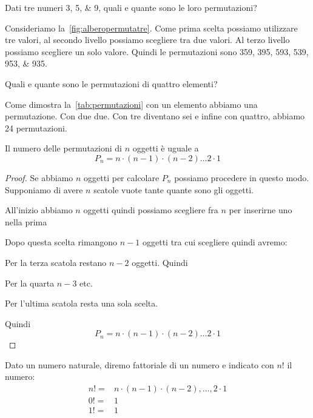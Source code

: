 \begin{exmp}
Dati tre numeri \numlist{3;5;9}, quali e quante sono le loro permutazioni? 
\end{exmp}
Consideriamo la~\vref{fig:alberopermutatre}. Come prima scelta possiamo utilizzare tre valori, al secondo livello possiamo scegliere tra due valori. Al terzo livello possiamo scegliere un solo valore. Quindi le permutazioni sono \numlist{359;395;593;539;953;935}.
\begin{exmp}
	Quali e quante sono le permutazioni di quattro elementi?
\end{exmp}
Come dimostra la~\vref{tab:permutazioni} con un elemento abbiamo una permutazione. Con due due. Con tre diventano sei e infine con quattro, abbiamo 24 permutazioni.
\begin{thm}
	Il numero delle permutazioni di $n$ oggetti è uguale a
\[P_n=n\cdot (n-1)\cdot(n-2)\dots 2\cdot 1\]
\end{thm}
\begin{proof}
Se abbiamo $n$ oggetti per calcolare $P_n$ possiamo procedere in questo modo. Supponiamo di avere $n$ scatole vuote tante quante sono gli oggetti.\par 
\makebox[\linewidth]{\scatola{}\scatola{}\scatola{}\scatola{},\dots,\scatola{}}\par
 All'inizio abbiamo $n$ oggetti quindi possiamo scegliere fra $n$ per inserirne uno nella prima\par 
{}\par
 Dopo questa scelta rimangono $n-1$ oggetti tra cui scegliere quindi avremo:\par 
{}\par
 Per la terza scatola restano $n-2$ oggetti. Quindi\par 
{}\par
 Per la quarta $n-3$ etc.\par {}\par Per l'ultima scatola resta una sola scelta. \par {}\par Quindi \[P_n=n\cdot (n-1)\cdot(n-2)\dots 2\cdot 1\]
\end{proof}
\begin{defn}[Fattoriale]
	Dato un numero naturale, diremo fattoriale di un numero e indicato con $n!$ il numero:
	\begin{align*}
	n!=&n\cdot(n-1)\cdot (n-2),\dots,2\cdot 1\\
	0!=&1\\
	1!=&1
	\end{align*}
\end{defn}
